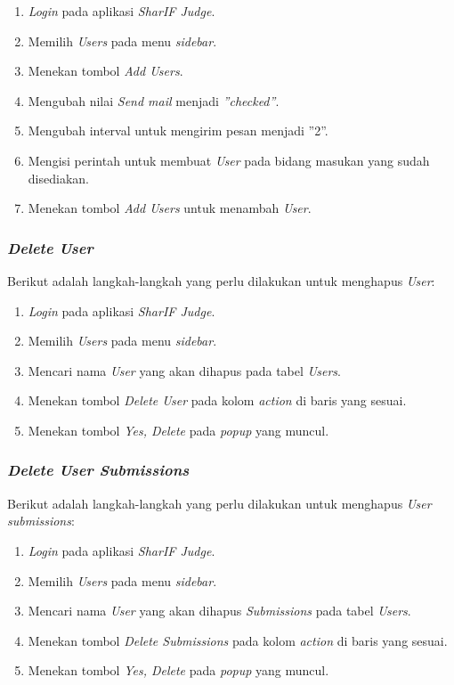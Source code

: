 \begin{enumerate}
	\item \textit{Login} pada aplikasi \textit{SharIF Judge}.
	\item Memilih \textit{Users} pada menu \textit{sidebar}.
	\item Menekan tombol \textit{Add Users}.
	\item Mengubah nilai \textit{Send mail} menjadi \textit{''checked''}.
	\item Mengubah interval untuk mengirim pesan menjadi ''2''.
	\item Mengisi perintah untuk membuat \textit{User} pada bidang masukan yang sudah disediakan.
	\item Menekan tombol \textit{Add Users} untuk menambah \textit{User}.
\end{enumerate}

\subsubsection{\textit{Delete User}}
\label{subsubsec:skenario_delete_user}
Berikut adalah langkah-langkah yang perlu dilakukan untuk menghapus \textit{User}:

\begin{enumerate}
	\item \textit{Login} pada aplikasi \textit{SharIF Judge}.
	\item Memilih \textit{Users} pada menu \textit{sidebar}.
	\item Mencari nama \textit{User} yang akan dihapus pada tabel \textit{Users}.
	\item Menekan tombol \textit{Delete User} pada kolom \textit{action} di baris yang sesuai.
	\item Menekan tombol \textit{Yes, Delete} pada \textit{popup} yang muncul.
\end{enumerate}

\subsubsection{\textit{Delete User Submissions}}
\label{subsubsec:skenario_delete_user_submissions}
Berikut adalah langkah-langkah yang perlu dilakukan untuk menghapus \textit{User submissions}:

\begin{enumerate}
	\item \textit{Login} pada aplikasi \textit{SharIF Judge}.
	\item Memilih \textit{Users} pada menu \textit{sidebar}.
	\item Mencari nama \textit{User} yang akan dihapus \textit{Submissions} pada tabel \textit{Users}.
	\item Menekan tombol \textit{Delete Submissions} pada kolom \textit{action} di baris yang sesuai.
	\item Menekan tombol \textit{Yes, Delete} pada \textit{popup} yang muncul.
\end{enumerate}

